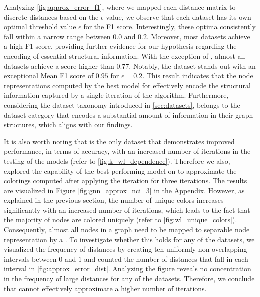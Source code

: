 Analyzing \cref{fig:approx_error_f1}, where we mapped each distance matrix to discrete distances based on the $\epsilon$ value, we observe that each dataset has its own optimal threshold value $\epsilon$ for the F1 score. Interestingly, these optima consistently fall within a narrow range between $0.0$ and $0.2$. Moreover, most datasets achieve a high F1 score, providing further evidence for our hypothesis regarding the encoding of essential structural information. With the exception of \reddit, almost all datasets achieve a score higher than $0.77$. Notably, the \nci dataset stands out with an exceptional Mean F1 score of $0.95$ for $\epsilon = 0.2$. This result indicates that the node representations computed by the best \gnn model for \nci effectively encode the structural information captured by a single iteration of the \wl algorithm. Furthermore, considering the dataset taxonomy introduced in \cref{sec:datasets}, \nci belongs to the dataset category that encodes a substantial amount of information in their graph structures, which aligns with our findings.

It is also worth noting that \nci is the only dataset that demonstrates improved performance, in terms of accuracy, with an increased number of \wl iterations in the testing of the \wlnn models (refer to \cref{fig:k_wl_dependence}). Therefore we also, explored the capability of the best performing \gnn model on \nci to approximate the colorings computed after applying the \wl iteration for three iterations. The results are visualized in Figure \ref{fig:gnn_approx_nci_3} in the Appendix. However, as explained in the previous section, the number of unique colors increases significantly with an increased number of \wl iterations, which leads to the fact that the majority of nodes are colored uniquely (refer to \cref{fig:wl_unique_colors}). Consequently, almost all nodes in a graph need to be mapped to separable node representation by a \gnn. To investigate whether this holds for any of the datasets, we visualized the frequency of distances by creating ten uniformly non-overlapping intervals between $0$ and $1$ and counted the number of distances that fall in each interval in \cref{fig:approx_error_dist}. Analyzing the figure reveals no concentration in the frequency of large distances for any of the datasets. Therefore, we conclude that \gnns cannot effectively approximate a higher number of \wl iterations.

